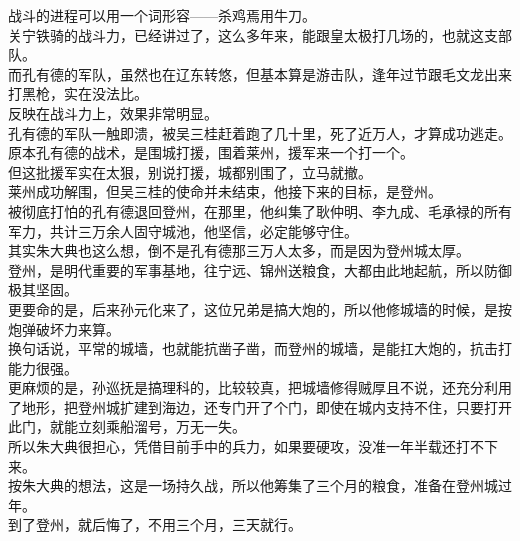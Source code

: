 \begin{multicols}{\theparacolNo}
战斗的进程可以用一个词形容——杀鸡焉用牛刀。\\

关宁铁骑的战斗力，已经讲过了，这么多年来，能跟皇太极打几场的，也就这支部队。\\

而孔有德的军队，虽然也在辽东转悠，但基本算是游击队，逢年过节跟毛文龙出来打黑枪，实在没法比。\\

反映在战斗力上，效果非常明显。\\

孔有德的军队一触即溃，被吴三桂赶着跑了几十里，死了近万人，才算成功逃走。\\

原本孔有德的战术，是围城打援，围着莱州，援军来一个打一个。\\

但这批援军实在太狠，别说打援，城都别围了，立马就撤。\\

莱州成功解围，但吴三桂的使命并未结束，他接下来的目标，是登州。\\

被彻底打怕的孔有德退回登州，在那里，他纠集了耿仲明、李九成、毛承禄的所有军力，共计三万余人固守城池，他坚信，必定能够守住。\\

其实朱大典也这么想，倒不是孔有德那三万人太多，而是因为登州城太厚。\\

登州，是明代重要的军事基地，往宁远、锦州送粮食，大都由此地起航，所以防御极其坚固。\\

更要命的是，后来孙元化来了，这位兄弟是搞大炮的，所以他修城墙的时候，是按炮弹破坏力来算。\\

换句话说，平常的城墙，也就能抗凿子凿，而登州的城墙，是能扛大炮的，抗击打能力很强。\\

更麻烦的是，孙巡抚是搞理科的，比较较真，把城墙修得贼厚且不说，还充分利用了地形，把登州城扩建到海边，还专门开了个门，即使在城内支持不住，只要打开此门，就能立刻乘船溜号，万无一失。\\

所以朱大典很担心，凭借目前手中的兵力，如果要硬攻，没准一年半载还打不下来。\\

按朱大典的想法，这是一场持久战，所以他筹集了三个月的粮食，准备在登州城过年。\\

到了登州，就后悔了，不用三个月，三天就行。\\


\end{multicols}
